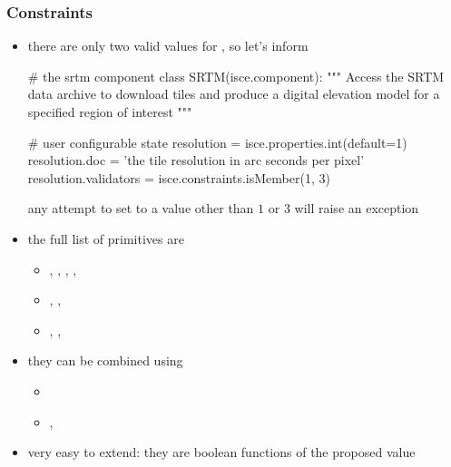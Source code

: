 \begin{frame}[fragile]
%
  \frametitle{Constraints}
%
  \begin{itemize}
%
  \item there are only two valid values for , so let's inform
%
    \begin{ipython}[firstnumber=4, gobble=6]{}
      # the srtm component
      class SRTM(isce.component):
          """
          Access the SRTM data archive to download tiles and produce
          a digital elevation model for a specified region of interest
          """

          # user configurable state
          resolution = isce.properties.int(default=1)
          resolution.doc = 'the tile resolution in arc seconds per pixel'
          resolution.validators = isce.constraints.isMember(1, 3)
    \end{ipython}
%
    any attempt to set  to a value other than $1$ or $3$ will raise an
    exception
%
  \item the full list of primitives are
    \begin{itemize}
    \item {}, ,
      , , 
    \item {}, , 
    \item {}, , 
    \end{itemize}
%
  \item they can be combined using
    \begin{itemize}
    \item {}
    \item {}, 
    \end{itemize}
%
  \item very easy to extend: they are boolean functions of the proposed value
%
  \end{itemize}
%
\end{frame}


